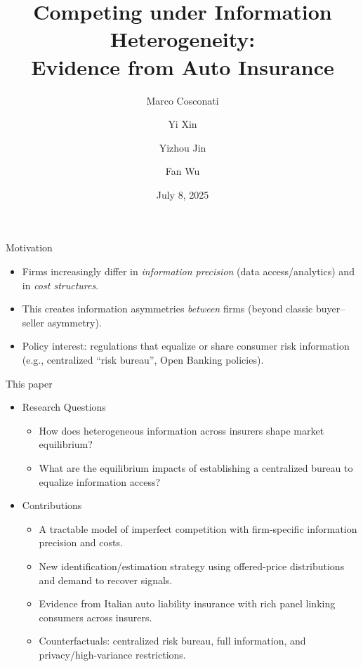 \documentclass[10pt,aspectratio=169]{beamer}
\title[Competing under Information Heterogeneity]{Competing under Information Heterogeneity:\\ Evidence from Auto Insurance}
\author[Cosconati, Fan, Jin, Wu]{Marco Cosconati \and Yi Xin  \and Yizhou Jin \and Fan Wu}
\institute{IVASS, Bank of Italy \and Caltech \and Caltech \and University of Toronto}
\date{July 8, 2025}
\begin{document}
\begin{frame}
  \titlepage
\end{frame}

\begin{frame}{Motivation}
\justifying
\begin{itemize}
  \item Firms increasingly differ in \emph{information precision} (data access/analytics) and in \emph{cost structures}.
  \item This creates information asymmetries \emph{between} firms (beyond classic buyer--seller asymmetry).
  \item Policy interest: regulations that equalize or share consumer risk information (e.g., centralized ``risk bureau'', Open Banking policies).
\end{itemize}
\end{frame}

\begin{frame}{This paper}
\begin{itemize}
  \item Research Questions
  
  \begin{itemize}
  \item How does heterogeneous information across insurers shape market equilibrium? %
  \item What are the equilibrium impacts of establishing a centralized bureau to equalize information access?
  \end{itemize} 
  \item Contributions
  \begin{itemize}
  \item A tractable model of imperfect competition with firm-specific information precision and costs.
  \item New identification/estimation strategy using offered-price distributions and demand to recover signals.
  \item Evidence from Italian auto liability insurance with rich panel linking consumers across insurers.
  \item Counterfactuals: centralized risk bureau, full information, and privacy/high-variance restrictions.
\end{itemize}
\end{itemize}
\end{frame}
\end{document}
